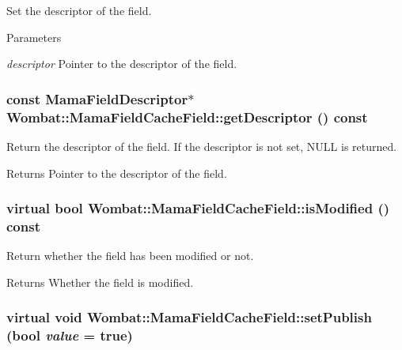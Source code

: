 Set the descriptor of the field. 
\begin{DoxyParams}{Parameters}
\item[{\em descriptor}]Pointer to the descriptor of the field. \end{DoxyParams}
\hypertarget{classWombat_1_1MamaFieldCacheField_a653c16e3b455088c37409a83cbe1f78c}{
\subsubsection[{getDescriptor}]{\setlength{\rightskip}{0pt plus 5cm}const {\bf MamaFieldDescriptor}$\ast$ Wombat::MamaFieldCacheField::getDescriptor () const}}
\label{classWombat_1_1MamaFieldCacheField_a653c16e3b455088c37409a83cbe1f78c}


Return the descriptor of the field. If the descriptor is not set, NULL is returned.

\begin{DoxyReturn}{Returns}
Pointer to the descriptor of the field. 
\end{DoxyReturn}
\hypertarget{classWombat_1_1MamaFieldCacheField_a13b4aed59d1cc1443cfcfbf904627136}{
\subsubsection[{isModified}]{\setlength{\rightskip}{0pt plus 5cm}virtual bool Wombat::MamaFieldCacheField::isModified () const}}
\label{classWombat_1_1MamaFieldCacheField_a13b4aed59d1cc1443cfcfbf904627136}


Return whether the field has been modified or not. \begin{DoxyReturn}{Returns}
Whether the field is modified. 
\end{DoxyReturn}
\hypertarget{classWombat_1_1MamaFieldCacheField_a68114cac0385bc88d9f807bacb2cfbaf}{
\subsubsection[{setPublish}]{\setlength{\rightskip}{0pt plus 5cm}virtual void Wombat::MamaFieldCacheField::setPublish (bool {\em value} = {\ttfamily true})}}
\label{classWombat_1_1MamaFieldCacheField_a68114cac0385bc88d9f807bacb2cfbaf}


